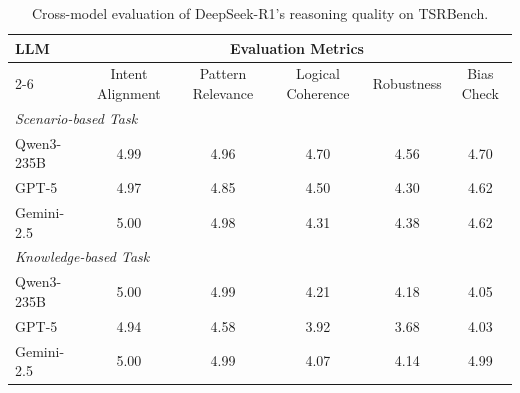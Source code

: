 \documentclass{article}
\theoremstyle{plain}
\theoremstyle{definition}
\theoremstyle{remark}
\begin{document}
\begin{table}[htbp]
\centering
\small
\caption{Cross-model evaluation of DeepSeek-R1's reasoning quality on TSRBench.}
\begin{tabular}{lccccc}
\toprule
\multirow{2}{*}{\textbf{LLM}} & \multicolumn{5}{c}{\textbf{Evaluation Metrics}} \\
\cmidrule(lr){2-6}
& Intent Alignment & Pattern Relevance & Logical Coherence & Robustness & Bias Check \\
\midrule
\multicolumn{6}{l}{\textit{Scenario-based Task}} \\
Qwen3-235B & 4.99 & 4.96 & 4.70 & 4.56 & 4.70 \\
GPT-5      & 4.97 & 4.85 & 4.50 & 4.30 & 4.62 \\
Gemini-2.5 & 5.00 & 4.98 & 4.31 & 4.38 & 4.62 \\
\midrule
\multicolumn{6}{l}{\textit{Knowledge-based Task}} \\
Qwen3-235B & 5.00 & 4.99 & 4.21 & 4.18 & 4.05 \\
GPT-5      & 4.94 & 4.58 & 3.92 & 3.68 & 4.03 \\
Gemini-2.5 & 5.00 & 4.99 & 4.07 & 4.14 & 4.99 \\
\bottomrule
\end{tabular}
\label{tab:cross_validation}
\end{table}
\end{document}
